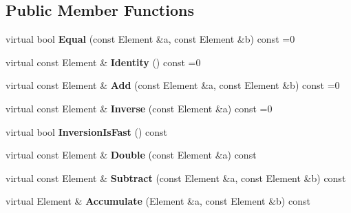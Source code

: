 \subsection*{Public Member Functions}
\begin{DoxyCompactItemize}
\item 
\hypertarget{class_abstract_group_a0d72cb663566b7c056f846a561547bec}{
virtual bool {\bfseries Equal} (const Element \&a, const Element \&b) const =0}
\label{class_abstract_group_a0d72cb663566b7c056f846a561547bec}

\item 
\hypertarget{class_abstract_group_a929ba4e6a7d7d80344946efad0456d5b}{
virtual const Element \& {\bfseries Identity} () const =0}
\label{class_abstract_group_a929ba4e6a7d7d80344946efad0456d5b}

\item 
\hypertarget{class_abstract_group_aa813430d9e4244de24c487d090eb5797}{
virtual const Element \& {\bfseries Add} (const Element \&a, const Element \&b) const =0}
\label{class_abstract_group_aa813430d9e4244de24c487d090eb5797}

\item 
\hypertarget{class_abstract_group_ab22563bc0dcb544399d7e22b3589e165}{
virtual const Element \& {\bfseries Inverse} (const Element \&a) const =0}
\label{class_abstract_group_ab22563bc0dcb544399d7e22b3589e165}

\item 
\hypertarget{class_abstract_group_ac571ac9b67ad9b7ef893c715b1ec2f43}{
virtual bool {\bfseries InversionIsFast} () const }
\label{class_abstract_group_ac571ac9b67ad9b7ef893c715b1ec2f43}

\item 
\hypertarget{class_abstract_group_afe7761c37cf87e16ee9cb981faf5d6e7}{
virtual const Element \& {\bfseries Double} (const Element \&a) const }
\label{class_abstract_group_afe7761c37cf87e16ee9cb981faf5d6e7}

\item 
\hypertarget{class_abstract_group_af9d3065d91b4e567397cbe83adb48cf6}{
virtual const Element \& {\bfseries Subtract} (const Element \&a, const Element \&b) const }
\label{class_abstract_group_af9d3065d91b4e567397cbe83adb48cf6}

\item 
\hypertarget{class_abstract_group_aa5113d3e1a7d669d2cd48a9b2fb5a725}{
virtual Element \& {\bfseries Accumulate} (Element \&a, const Element \&b) const }
\label{class_abstract_group_aa5113d3e1a7d669d2cd48a9b2fb5a725}


\end{DoxyCompactItemize}
